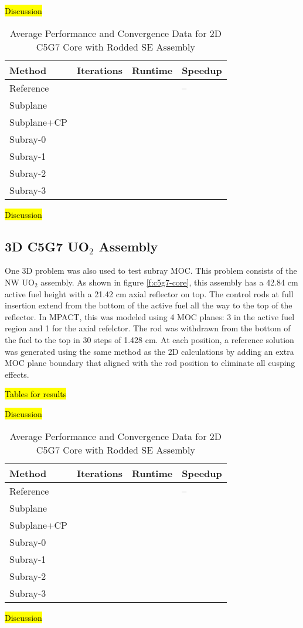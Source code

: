 \hl{Discussion}

\begin{table}[h]
    \centering
    \caption{Average Performance and Convergence Data for 2D C5G7 Core with Rodded SE Assembly}\label{t:subray-performance-2dcoreSE}
    \begin{tabular}{l l l l}\toprule
        Method & Iterations & Runtime & Speedup \\\midrule
        Reference &  &  & -- \\
        Subplane &  &  &  \\
        Subplane+CP &  &  &  \\
        Subray-0 &  &  &  \\
        Subray-1 &  &  &  \\
        Subray-2 &  &  &  \\
        Subray-3 &  &  &  \\
        \bottomrule
    \end{tabular}
\end{table}

\hl{Discussion}

\subsection{3D C5G7 UO\texorpdfstring{$_2$}{2} Assembly}

One 3D problem was also used to test subray MOC.  This problem consists of the NW UO$_2$ assembly.  As shown in figure \ref{f:c5g7-core}, this assembly has a 42.84 cm active fuel height with a 21.42 cm axial reflector on top.  The control rods at full insertion extend from the bottom of the active fuel all the way to the top of the reflector.  In MPACT, this was modeled using 4 MOC planes: 3 in the active fuel region and 1 for the axial refelctor.  The rod was withdrawn from the bottom of the fuel to the top in 30 steps of 1.428 cm.  At each position, a reference solution was generated using the same method as the 2D calculations by adding an extra MOC plane boundary that aligned with the rod position to eliminate all cusping effects.

\hl{Tables for results}

\hl{Discussion}

\begin{table}[h]
    \centering
    \caption{Average Performance and Convergence Data for 2D C5G7 Core with Rodded SE Assembly}\label{t:subray-performance-3Dassembly}
    \begin{tabular}{l l l l}\toprule
        Method & Iterations & Runtime & Speedup \\\midrule
        Reference &  &  & -- \\
        Subplane &  &  &  \\
        Subplane+CP &  &  &  \\
        Subray-0 &  &  &  \\
        Subray-1 &  &  &  \\
        Subray-2 &  &  &  \\
        Subray-3 &  &  &  \\
        \bottomrule
    \end{tabular}
\end{table}

\hl{Discussion}